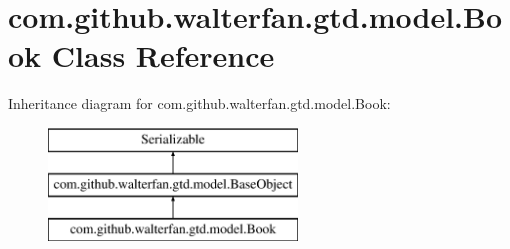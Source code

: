 \hypertarget{classcom_1_1github_1_1walterfan_1_1gtd_1_1model_1_1Book}{\section{com.\-github.\-walterfan.\-gtd.\-model.\-Book Class Reference}
\label{classcom_1_1github_1_1walterfan_1_1gtd_1_1model_1_1Book}
}
Inheritance diagram for com.\-github.\-walterfan.\-gtd.\-model.\-Book\-:\begin{figure}[H]
\begin{center}
\leavevmode
\includegraphics[height=3.000000cm]{classcom_1_1github_1_1walterfan_1_1gtd_1_1model_1_1Book}
\end{center}
\end{figure}
